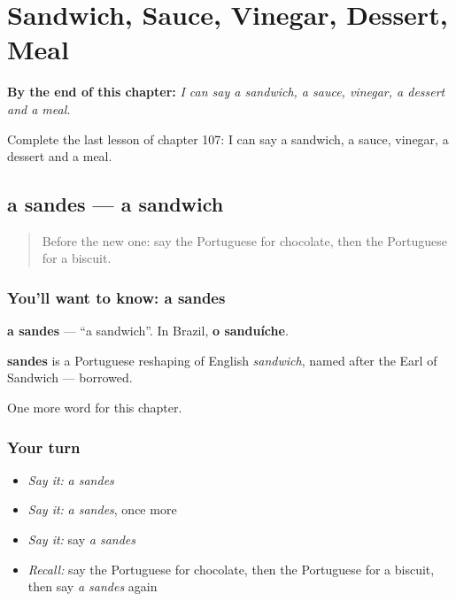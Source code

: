 
\chapter{Sandwich, Sauce, Vinegar, Dessert, Meal}
\label{ch:pt-sandwich-sauce-vinegar-dessert-meal}

\begin{chapteropening}
\textbf{By the end of this chapter:} \emph{I can say a sandwich, a sauce, vinegar, a dessert and a meal.}

Complete the last lesson of chapter 107: I can say a sandwich, a sauce, vinegar, a dessert and a meal.
\end{chapteropening}

\section[a sandes]{a sandes — a sandwich}

\label{lesson:PT-C107-sandes}



\begin{quote}
Before the new one: say the Portuguese for chocolate, then the Portuguese for a biscuit.
\end{quote}

\subsection*{You'll want to know: a sandes}
\textbf{a sandes} — \textquotedblleft{}a sandwich\textquotedblright{}. In Brazil, \textbf{o sanduíche}.

\begin{cousinweb}
\textbf{sandes} is a Portuguese reshaping of English \emph{sandwich}, named after the Earl of Sandwich — borrowed.
\end{cousinweb}

\begin{grammarlens}[title={What you've built}]
One more word for this chapter.
\end{grammarlens}

\subsection*{Your turn}
\begin{itemize}
\raggedright
  \item \emph{Say it:} \emph{a sandes}
  \item \emph{Say it:} \emph{a sandes}, once more
  \item \emph{Say it:} say \emph{a sandes}
  \item \emph{Recall:} say the Portuguese for chocolate, then the Portuguese for a biscuit, then say \emph{a sandes} again
\end{itemize}


